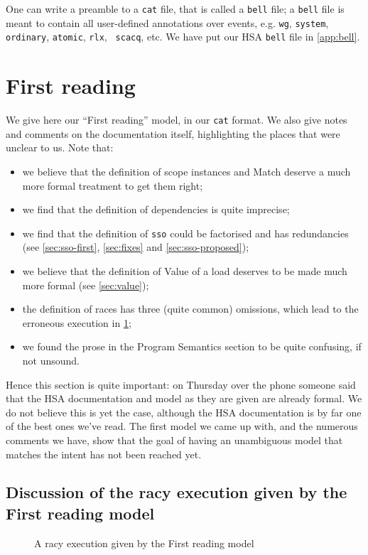 \documentclass[a4paper]{article}
\begin{document}
One can write a preamble to a {\tt cat} file, that is called a {\tt bell} file;
a {\tt bell} file is meant to contain all user-defined annotations over events,
e.g. {\tt wg}, {\tt system}, {\tt ordinary}, {\tt atomic}, {\tt rlx}, {\tt
scacq}, etc. We have put our HSA {\tt bell} file in \myapp\ref{app:bell}.

\clearpage

\section{First reading \label{sec:first-reading}}

We give here our ``First reading'' model, in our {\tt cat} format. We also give
notes and comments on the documentation itself, highlighting the places that
were unclear to us. Note that:
\begin{itemize}
\item we believe that the definition of scope instances and Match deserve a
much more formal treatment to get them right;
\item we find that the definition of dependencies is quite imprecise;
\item we find that the definition of {\tt sso} could be factorised and has
redundancies (see \mysec\ref{sec:sso-first}, \ref{sec:fixes} and \ref{sec:sso-proposed});
\item we believe that the definition of Value of a load deserves to be made
much more formal (see \mysec\ref{sec:value});
\item the definition of races has three (quite common) omissions, which lead to the erroneous execution in \myfig\ref{fig:race-first};
\item we found the prose in the Program Semantics section to be quite
confusing, if not unsound.  \end{itemize}

Hence this section is quite important: on Thursday over the phone someone said
that the HSA documentation and model as they are given are already formal. We do
not believe this is yet the case, although the HSA documentation is by far one
of the best ones we've read. The first model we came up with, and the numerous
comments we have, show that the goal of having an unambiguous model that matches
the intent has not been reached yet.

\subsection{{\color{blue} Discussion of the racy execution given by the First
reading model} \label{sec:race-discussion}}
\begin{figure}
\caption{A racy execution given by the First reading model \label{fig:race-first}}
\end{figure}
\end{document}
